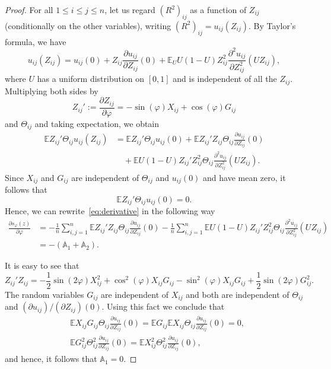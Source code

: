 \documentclass[a4paper,12pt]{amsart}
\numberwithin{equation}{section}
\theoremstyle{remark}
\def\E{{\mathbb E}}
\begin{document}
\begin{proof}
For all $1 \le i \le j \le n$, let us regard $(R^2)_{ij}$ as a function of $Z_{ij}$ (conditionally on the other variables), writing $(R^2)_{ij} = u_{ij}(Z_{ij})$. By Taylor's formula, we have
\begin{equation*}
u_{i j} (Z_{ij}) = u_{i j}(0) + Z_{ij}\frac{\partial u_{i j}}{\partial Z_{ij}}(0) +
\E_{U} U (1-U) Z_{ij}^2 \frac{\partial^2 u_{i j}}{\partial Z_{ij}^2}(UZ_{ij}),
\end{equation*}
where $U$ has a uniform distribution on $[0,1]$ and is independent of all the $Z_{ij}$. Multiplying both sides by
\[
Z_{ij}' := \frac{\partial Z_{ij}}{\partial \varphi} = - \sin (\varphi) X_{i j} + \cos (\varphi) G_{i j}
\]
and $\Theta_{ij}$ and taking expectation, we obtain
\begin{align*}
\E Z_{i j}' \Theta_{ij} u_{i j} (Z_{ij}) &=  \E Z_{i j}' \Theta_{ij} u_{i j}(0) + \E Z_{i j}'Z_{i j}\Theta_{ij}\frac{\partial u_{i j}}{\partial Z_{i j}}(0)\\
&\quad + \E U (1-U) Z_{i j}' Z_{i j}^2 \Theta_{ij} \frac{\partial^2 u_{i j}}{\partial Z_{i j}^2}(U Z_{i j}).
\end{align*}
Since $X_{ij}$ and $G_{ij}$ are independent of $\Theta_{ij}$ and $u_{ij}(0)$ and have mean zero, it follows that
\[
\E Z_{i j}' \Theta_{ij} u_{i j}(0) = 0.
\]
Hence, we can rewrite~\eqref{eq:derivative} in the following way
\begin{align*}
\frac{\partial s_\varphi(z)}{\partial \varphi} &= -\frac{1}{n} \sum_{i,j = 1}^n \E Z_{i j}'Z_{i j}\Theta_{ij}\frac{\partial u_{i j}}{\partial Z_{i j}}(0) -
\frac{1}{n} \sum_{i,j = 1}^n  \E U (1-U) Z_{i j}' Z_{i j}^2 \Theta_{ij} \frac{\partial^2 u_{i j}}{\partial Z_{i j}^2}(U Z_{i j})\\
& = -(\mathbb A_1 + \mathbb A_2).
\end{align*}

It is easy to see that
\begin{equation}\label{eq:ProdZZ'}
Z_{ij}' Z_{i j} = - \frac{1}{2} \sin (2 \varphi) X_{ij}^2 + \cos^2 (\varphi) X_{i j} G_{i j} - \sin^2 (\varphi) X_{i j} G_{i j} + \frac{1}{2} \sin (2 \varphi) G_{ij}^2.
\end{equation}
The random variables $G_{ij}$ are independent of $X_{ij}$ and both are independent of $\Theta_{ij}$ and $(\partial u_{ij})/(\partial Z_{ij})(0)$. Using this fact we conclude that
\begin{align*}
&\E X_{i j} G_{i j} \Theta_{ij} \frac{\partial u_{i j}}{\partial Z_{i j}}(0) = \E G_{ij} \E X_{i j} \Theta_{ij} \frac{\partial u_{i j}}{\partial Z_{i j}}(0)  = 0, \\
&\E G_{ij}^2 \Theta_{ij}^2 \frac{\partial u_{ij}}{\partial Z_{ij}}(0) = \E X_{ij}^2\Theta_{ij}^2\frac{\partial u_{ij}}{\partial Z_{ij}}(0),
\end{align*}
and hence, it follows that $\mathbb{A}_1 = 0$.


\end{proof}
\end{document}
